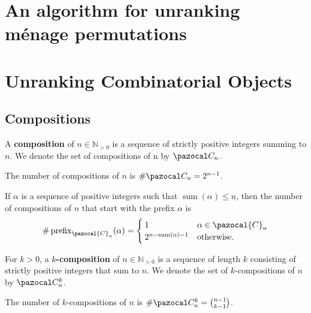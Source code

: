 \section{An algorithm for unranking m\'enage permutations}
\label{apndx:haskell}
\begin{singlespace}
  
  \end{singlespace}

\section{Unranking Combinatorial Objects}
\label{apndx:unranking}
\subsection{Compositions}
\begin{definition}
  A \textbf{composition} of $n \in \mathbb{N}_{>0}$ is a sequence of
  strictly positive integers summing to $n$. We denote the set of compositions
  of n by $\pazocal C_n$.
\end{definition}

\begin{lemma} %
  The number of compositions of $n$ is $\#\pazocal C_n = 2^{n-1}$.
\end{lemma}

\begin{proposition}
  If $\alpha$ is a sequence of positive integers such that
  $\operatorname{sum}(\alpha) \leq n$, then
  the number of compositions of $n$ that start with the prefix $\alpha$
  is \[
    \#\operatorname{prefix}_{\pazocal{C}_n}(\alpha) = \begin{cases}
      1 & \alpha \in \pazocal{C}_n \\
      2^{n - \operatorname{sum}(\alpha) - 1} & \text{otherwise}.
    \end{cases}
  \]
\end{proposition}

\begin{definition}
  For $k > 0$, a $k$\textbf{-composition} of $n \in \mathbb{N}_{>0}$
  is a sequence of length $k$ consisting of strictly positive integers that sum
  to $n$. We denote the set of $k$-compositions of $n$ by $\pazocal C_n^{k}$.
\end{definition}

\begin{lemma}
  The number of $k$-compositions of $n$ is $\#\pazocal C_n^{k} = \binom{n-1}{k-1}$.
\end{lemma}

